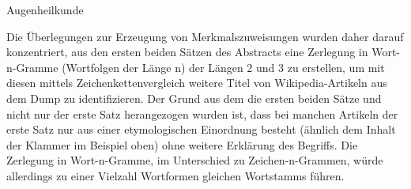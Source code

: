 \documentclass[pagesize,DIV=calc,12pt,draft]{scrreprt}
\begin{document}
\begin{description}
\item[Augenheilkunde]
\end{description}

Die Überlegungen zur Erzeugung von Merkmalszuweisungen wurden daher darauf konzentriert, aus den ersten beiden Sätzen des Abstracts eine Zerlegung in Wort-n-Gramme (Wortfolgen der Länge n) der Längen 2 und 3 zu erstellen, um mit diesen mittels Zeichenkettenvergleich weitere Titel von Wikipedia-Artikeln aus dem Dump zu identifizieren.
Der Grund aus dem die ersten beiden Sätze und nicht nur der erste Satz herangezogen wurden ist, dass bei manchen Artikeln der erste Satz nur aus einer etymologischen Einordnung besteht (ähnlich dem Inhalt der Klammer im Beispiel oben) ohne weitere Erklärung des Begriffs. 
Die Zerlegung in Wort-n-Gramme, im Unterschied zu Zeichen-n-Grammen, würde allerdings zu einer Vielzahl Wortformen gleichen Wortstamms führen.
\end{document}
